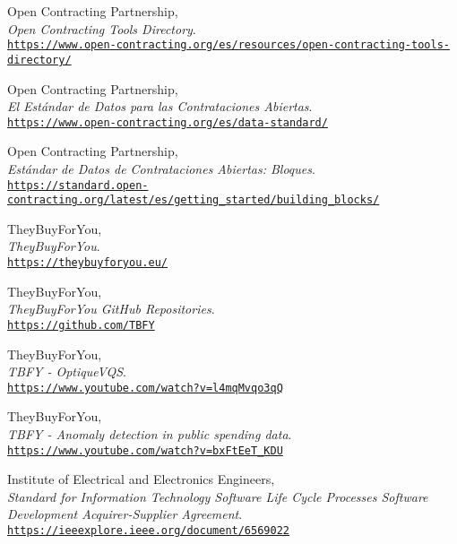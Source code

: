 \begin{thebibliography}{X}
            Open Contracting Partnership,
            \\ \textit{Open Contracting Tools Directory}.
            \\ \texttt{\url{https://www.open-contracting.org/es/resources/open-contracting-tools-directory/}}
            
            Open Contracting Partnership,
            \\ \textit{El Estándar de Datos para las Contrataciones Abiertas}.
            \\ \texttt{\url{https://www.open-contracting.org/es/data-standard/}}
            
            Open Contracting Partnership,
            \\ \textit{Estándar de Datos de Contrataciones Abiertas: Bloques}.
            \\ \texttt{\url{https://standard.open-contracting.org/latest/es/getting_started/building_blocks/}}
            
            TheyBuyForYou,
            \\ \textit{TheyBuyForYou}.
            \\ \texttt{\url{https://theybuyforyou.eu/}}
            
            TheyBuyForYou,
            \\ \textit{TheyBuyForYou GitHub Repositories}.
            \\ \texttt{\url{https://github.com/TBFY}}
            
            TheyBuyForYou,
            \\ \textit{TBFY - OptiqueVQS}.
            \\ \texttt{\url{https://www.youtube.com/watch?v=l4mqMvqo3qQ}}
            
            TheyBuyForYou,
            \\ \textit{TBFY - Anomaly detection in public spending data}.
            \\ \texttt{\url{https://www.youtube.com/watch?v=bxFtEeT_KDU}}
    
            Institute of Electrical and Electronics Engineers,
            \\ \textit{Standard for Information Technology Software Life Cycle Processes Software Development Acquirer-Supplier Agreement}.
            \\ \texttt{\url{https://ieeexplore.ieee.org/document/6569022}}
    

\end{thebibliography}
